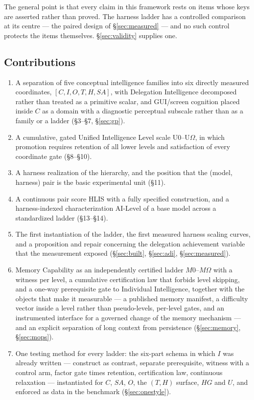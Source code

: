 \documentclass[11pt]{article}
\theoremstyle{definition}
\newcommand{\Om}{\ensuremath{\Omega}}
\begin{document}
The general point is that every claim in this framework rests on items whose keys are asserted rather than proved. The harness ladder has a controlled comparison at its centre --- the paired design of \S\ref{sec:measured} --- and no such control protects the items themselves. \S\ref{sec:validity} supplies one.

\subsection{Contributions}

\begingroup\sloppy
\begin{enumerate}
\item A separation of five conceptual intelligence families into six directly measured coordinates,
      $[C,I,O,T,H,SA]$, with Delegation Intelligence decomposed rather than treated as a primitive scalar, and GUI/screen cognition placed inside $C$ as a domain with a diagnostic perceptual subscale rather than as a family or a ladder (\S3--\S7, \S\ref{sec:gp}).
\item A cumulative, gated Unified Intelligence Level scale U0--U\Om{}, in which promotion requires retention of all lower levels and satisfaction of every coordinate gate (\S8--\S10).
\item A harness realization of the hierarchy, and the position that the (model, harness) pair is the basic experimental unit (\S11).
\item A continuous pair score HLIS with a fully specified construction, and a harness-indexed characterization AI-Level of a base model across a standardized ladder (\S13--\S14).
\item The first instantiation of the ladder, the first measured harness scaling curves, and a proposition and repair concerning the delegation achievement variable that the measurement exposed (\S\ref{sec:built}, \S\ref{sec:adi}, \S\ref{sec:measured}).
\item Memory Capability as an independently certified ladder $M0$--$M\Om{}$ with a witness per level, a cumulative certification law that forbids level skipping, and a one-way prerequisite gate to Individual Intelligence, together with the objects that make it measurable --- a published memory manifest, a difficulty vector inside a level rather than pseudo-levels, per-level gates, and an instrumented interface for a governed change of the memory mechanism --- and an explicit separation of long context from persistence (\S\ref{sec:memory}, \S\ref{sec:mops}).
\item One testing method for every ladder: the six-part schema in which $I$ was already written --- construct as contrast, separate prerequisite, witness with a control arm, factor gate times retention, certification law, continuous relaxation --- instantiated for $C$, $SA$, $O$, the $(T,H)$ surface, $HG$ and $U$, and enforced as data in the benchmark (\S\ref{sec:onestyle}).

\end{enumerate}
\end{document}
